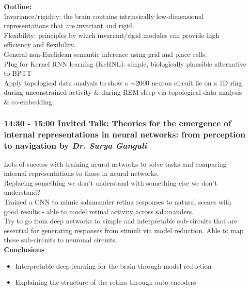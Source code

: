 \documentclass[12pt]{article}
\begin{document}
\textbf{Outline:} \\

Invariance/rigidity: the brain contains intrinsically low-dimensional representations that are invariant and rigid. \\

Flexibility: principles by which invariant/rigid modules can provide high efficiency and flexibility. \\

General non-Euclidean semantic inference using grid and place cells. \\

Plug for Kernel RNN learning (KeRNL): simple, biologically plausible alternative to BPTT \cite{roth2018kernel} \\

Apply topological data analysis to show a $\sim$2000 neuron circuit \cite{Chaudhuri2019} lie on a 1D ring during unconstrained activity \& during REM sleep via topological data analysis \& co-embedding. \\


\subsubsection{14:30 - 15:00 Invited Talk: Theories for the emergence of internal representations in neural networks: from perception to navigation by \textit{Dr. Surya Ganguli}}

Lots of success with training neural networks to solve tasks and comparing internal representations to those in neural networks. \\

Replacing something we don't understand with something else we don't understand? \\

Trained a CNN to mimic salamander retina responses to natural scenes with good results - able to model retinal activity across salamanders. \\

Try to go from deep networks to simple and interpretable sub-circuits that are essential for generating responses from stimuli via model reduction. Able to map these sub-circuits to neuronal circuits. \\

\textbf{Conclusions}
\begin{itemize}
\item Interpretable deep learning for the brain through model reduction
\item Explaining the structure of the retina through auto-encoders
\end{itemize}
\end{document}
